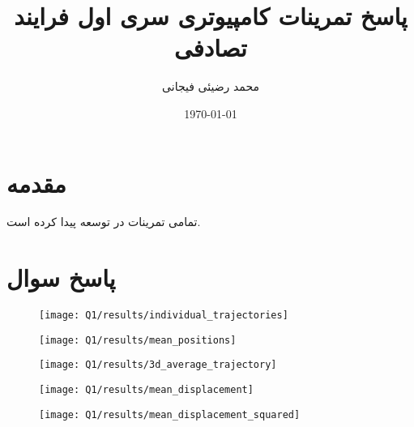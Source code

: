 \documentclass[12pt,onecolumn,a4paper]{article}
\author{
	محمد رضیئی فیجانی
}
\title{
	پاسخ تمرینات کامپیوتری سری اول فرایند تصادفی
}
\date{\today}
\theoremstyle{definition}
\newcommand\question{
	\section{پاسخ سوال \tartibi{section}}
}
\begin{document}
	
	
	\pagestyle{fancy}
	\maketitle
	
	\section*{مقدمه}
	تمامی تمرینات در 
	\cite{matlab2024a}
	توسعه پیدا کرده است.
	
	\FloatBarrier
	\question%
	



\begin{figure}[H]
	\centering
	\texttt{[image: Q1/results/individual\_trajectories]}
	\caption{}
	\label{fig:individualtrajectories}
\end{figure}

\begin{figure}[H]
	\centering
	\texttt{[image: Q1/results/mean\_positions]}
	\caption{}
	\label{fig:meanpositions}
\end{figure}


\begin{figure}[H]
	\centering
	\texttt{[image: Q1/results/3d\_average\_trajectory]}
	\caption{}
	\label{fig:3daveragetrajectory}
\end{figure}






\begin{figure}[H]
	\centering
	\texttt{[image: Q1/results/mean\_displacement]}
	\caption{}
	\label{fig:meandisplacement}
\end{figure}


\begin{figure}[H]
	\centering
	\texttt{[image: Q1/results/mean\_displacement\_squared]}
	\caption{}
	\label{fig:meandisplacementsquared}
\end{figure}
\end{document}
